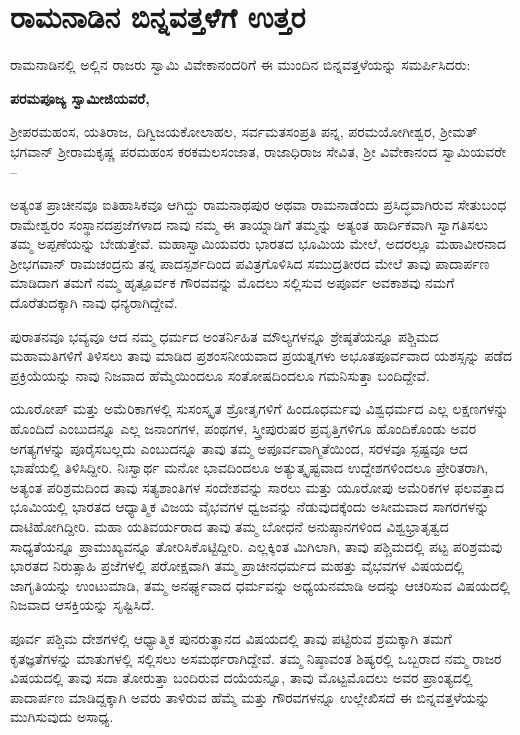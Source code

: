 
\chapter{ರಾಮನಾಡಿನ ಬಿನ್ನವತ್ತಳೆಗೆ ಉತ್ತರ}

ರಾಮನಾಡಿನಲ್ಲಿ ಅಲ್ಲಿನ ರಾಜರು ಸ್ವಾಮಿ ವಿವೇಕಾನಂದರಿಗೆ ಈ ಮುಂದಿನ ಬಿನ್ನವತ್ತಳೆಯನ್ನು ಸಮರ್ಪಿಸಿದರು:

\textbf{ಪರಮಪೂಜ್ಯ ಸ್ವಾಮೀಜಿಯವರೆ,}

ಶ‍್ರೀಪರಮಹಂಸ, ಯತಿರಾಜ, ದಿಗ್ವಿಜಯಕೋಲಾಹಲ, ಸರ್ವಮತ\break ಸಂಪ್ರತಿ ಪನ್ನ, ಪರಮಯೋಗೀಶ್ವರ, ಶ‍್ರೀಮತ್​ ಭಗವಾನ್​ ಶ‍್ರೀರಾಮಕೃಷ್ಣ ಪರಮಹಂಸ ಕರಕಮಲಸಂಜಾತ, ರಾಜಾಧಿರಾಜ ಸೇವಿತ, ಶ‍್ರೀ ವಿವೇಕಾನಂದ ಸ್ವಾಮಿಯವರೇ –

ಅತ್ಯಂತ ಪ್ರಾಚೀನವೂ ಐತಿಹಾಸಿಕವೂ ಆಗಿದ್ದು ರಾಮನಾಥಪುರ ಅಥವಾ ರಾಮನಾಡೆಂದು ಪ್ರಸಿದ್ಧವಾಗಿರುವ ಸೇತುಬಂಧ ರಾಮೇಶ್ವರಂ ಸಂಸ್ಥಾನದ\break ಪ್ರಜೆಗಳಾದ ನಾವು ನಮ್ಮ ಈ ತಾಯ್ನಾಡಿಗೆ ತಮ್ಮನ್ನು ಅತ್ಯಂತ ಹಾರ್ದಿಕವಾಗಿ ಸ್ವಾಗತಿಸಲು ತಮ್ಮ ಅಪ್ಪಣೆಯನ್ನು ಬೇಡುತ್ತೇವೆ. ಮಹಾಸ್ವಾಮಿಯವರು ಭಾರತದ ಭೂಮಿಯ ಮೇಲೆ, ಅದರಲ್ಲೂ ಮಹಾವೀರನಾದ ಶ‍್ರೀಭಗವಾನ್​ ರಾಮಚಂದ್ರನು ತನ್ನ ಪಾದಸ್ಪರ್ಶದಿಂದ ಪವಿತ್ರಗೊಳಿಸಿದ ಸಮುದ್ರತೀರದ ಮೇಲೆ ತಾವು ಪಾದಾರ್ಪಣ ಮಾಡಿದಾಗ ತಮಗೆ ನಮ್ಮ ಹೃತ್ಪೂರ್ವಕ ಗೌರವವನ್ನು ಮೊದಲು ಸಲ್ಲಿಸುವ ಅಪೂರ್ವ ಅವಕಾಶವು ನಮಗೆ ದೊರೆತುದಕ್ಕಾಗಿ ನಾವು ಧನ್ಯರಾಗಿದ್ದೇವೆ.

ಪುರಾತನವೂ ಭವ್ಯವೂ ಆದ ನಮ್ಮ ಧರ್ಮದ ಅಂತರ್ನಿಹಿತ ಮೌಲ್ಯಗಳನ್ನೂ ಶ್ರೇಷ್ಠತೆಯನ್ನೂ ಪಶ್ಚಿಮದ ಮಹಾಮತಿಗಳಿಗೆ ತಿಳಿಸಲು ತಾವು ಮಾಡಿದ ಪ್ರಶಂಸನೀಯವಾದ ಪ್ರಯತ್ನಗಳು ಅಭೂತಪೂರ್ವವಾದ ಯಶಸ್ಸನ್ನು ಪಡೆದ ಪ್ರಕ್ರಿಯೆಯನ್ನು ನಾವು ನಿಜವಾದ ಹೆಮ್ಮೆಯಿಂದಲೂ ಸಂತೋಷದಿಂದಲೂ ಗಮನಿಸುತ್ತಾ ಬಂದಿದ್ದೇವೆ.

ಯೂರೋಪ್​ ಮತ್ತು ಅಮೆರಿಕಾಗಳಲ್ಲಿ ಸುಸಂಸ್ಕೃತ ಶ್ರೋತೃಗಳಿಗೆ ಹಿಂದೂಧರ್ಮವು ವಿಶ್ವಧರ್ಮದ ಎಲ್ಲ ಲಕ್ಷಣಗಳನ್ನು ಹೊಂದಿದೆ ಎಂಬುದನ್ನೂ ಎಲ್ಲ ಜನಾಂಗಗಳ, ಪಂಥಗಳ, ಸ್ತ್ರೀಪುರುಷರ ಪ್ರವೃತ್ತಿಗಳಿಗೂ ಹೊಂದಿಕೊಂಡು ಅವರ ಅಗತ್ಯಗಳನ್ನು ಪೂರೈಸಬಲ್ಲದು ಎಂಬುದನ್ನೂ ತಾವು ತಮ್ಮ ಅಪೂರ್ವ\break ವಾಗ್ಮಿತೆಯಿಂದ, ಸರಳವೂ ಸ್ಪಷ್ಟವೂ ಆದ ಭಾಷೆಯಲ್ಲಿ ತಿಳಿಸಿದ್ದೀರಿ. ನಿಃಸ್ವಾರ್ಥ ಮನೋ ಭಾವದಿಂದಲೂ ಅತ್ಯುತ್ಕೃಷ್ಟವಾದ ಉದ್ದೇಶಗಳಿಂದಲೂ ಪ್ರೇರಿತರಾಗಿ, ಅತ್ಯಂತ ಪರಿಶ್ರಮದಿಂದ ತಾವು ಸತ್ಯಶಾಂತಿಗಳ ಸಂದೇಶವನ್ನು ಸಾರಲು ಮತ್ತು ಯೂರೋಪು ಅಮೆರಿಕಗಳ ಫಲವತ್ತಾದ ಭೂಮಿಯಲ್ಲಿ ಭಾರತದ ಆಧ್ಯಾತ್ಮಿಕ ವಿಜಯ ವೈಭವಗಳ ಧ್ವಜವನ್ನು ನೆಡುವುದಕ್ಕೆಂದು ಅಸೀಮವಾದ ಸಾಗರಗಳನ್ನು ದಾಟಿಹೋಗಿದ್ದೀರಿ. ಮಹಾ ಯತಿವರ್ಯರಾದ ತಾವು ತಮ್ಮ ಬೋಧನೆ ಅನುಷ್ಠಾನಗಳಿಂದ ವಿಶ್ವಭ್ರಾತೃತ್ವದ ಸಾಧ್ಯತೆಯನ್ನೂ ಪ್ರಾಮುಖ್ಯವನ್ನೂ ತೋರಿಸಿಕೊಟ್ಟಿದ್ದೀರಿ. ಎಲ್ಲಕ್ಕಿಂತ ಮಿಗಿಲಾಗಿ, ತಾವು ಪಶ್ಚಿಮದಲ್ಲಿ ಪಟ್ಟ ಪರಿಶ್ರಮವು ಭಾರತದ ನಿರುತ್ಸಾಹಿ ಪ್ರಜೆಗಳಲ್ಲಿ ಪರೋಕ್ಷವಾಗಿ ತಮ್ಮ ಪ್ರಾಚೀನಧರ್ಮದ ಮಹತ್ತು ವೈಭವಗಳ ವಿಷಯದಲ್ಲಿ ಜಾಗೃತಿಯನ್ನು ಉಂಟುಮಾಡಿ, ತಮ್ಮ ಅನರ್ಘ್ಯವಾದ ಧರ್ಮವನ್ನು ಅಧ್ಯಯನಮಾಡಿ ಅದನ್ನು ಆಚರಿಸುವ ವಿಷಯದಲ್ಲಿ ನಿಜವಾದ ಆಸಕ್ತಿಯನ್ನು ಸೃಷ್ಟಿಸಿದೆ.

ಪೂರ್ವ ಪಶ್ಚಿಮ ದೇಶಗಳಲ್ಲಿ ಆಧ್ಯಾತ್ಮಿಕ ಪುನರುತ್ಥಾನದ ವಿಷಯದಲ್ಲಿ ತಾವು ಪಟ್ಟಿರುವ ಶ್ರಮಕ್ಕಾಗಿ ತಮಗೆ ಕೃತಜ್ಞತೆಗಳನ್ನು ಮಾತುಗಳಲ್ಲಿ ಸಲ್ಲಿಸಲು ಅಸಮರ್ಥರಾಗಿದ್ದೇವೆ. ತಮ್ಮ ನಿಷ್ಠಾವಂತ ಶಿಷ್ಯರಲ್ಲಿ ಒಬ್ಬರಾದ ನಮ್ಮ ರಾಜರ ವಿಷಯದಲ್ಲಿ ತಾವು ಸದಾ ತೋರುತ್ತಾ ಬಂದಿರುವ ದಯೆಯನ್ನೂ, ತಾವು ಮೊಟ್ಟಮೊದಲು ಅವರ ಪ್ರಾಂತ್ಯದಲ್ಲಿ ಪಾದಾರ್ಪಣ ಮಾಡಿದ್ದಕ್ಕಾಗಿ ಅವರು ತಾಳಿರುವ ಹೆಮ್ಮೆ ಮತ್ತು ಗೌರವಗಳನ್ನೂ ಉಲ್ಲೇಖಿಸದೆ ಈ ಬಿನ್ನವತ್ತಳೆಯನ್ನು ಮುಗಿಸುವುದು ಅಸಾಧ್ಯ.

